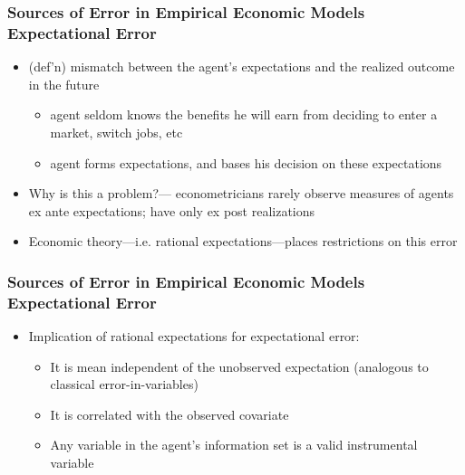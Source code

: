 
\begin{frame}
\frametitle{{Sources of Error in Empirical Economic Models}\\{Expectational
Error}}

\begin{itemize}
\item (def'n) mismatch between the agent's expectations and the realized
outcome in the future 

\begin{itemize}
\item agent seldom knows the benefits he will earn from deciding to enter a
market, switch jobs, etc 

\item agent forms expectations, and bases his decision on these expectations 
\end{itemize}

\item Why is this a problem?--- econometricians rarely observe measures of
agents ex ante expectations; have only ex post realizations

\item Economic theory---i.e. rational expectations---places restrictions on
this error
\end{itemize}
\end{frame}



\begin{frame}
\frametitle{{Sources of Error in Empirical Economic Models}\\{Expectational
Error}}

\begin{itemize}
\item Implication of rational expectations for expectational error: 

\begin{itemize}
\item It is mean independent of the unobserved expectation (analogous to
classical error-in-variables) 

\item It is correlated with the observed covariate 

\item Any variable in the agent's information set is a valid instrumental
variable 
\end{itemize}
\end{itemize}
\end{frame}

